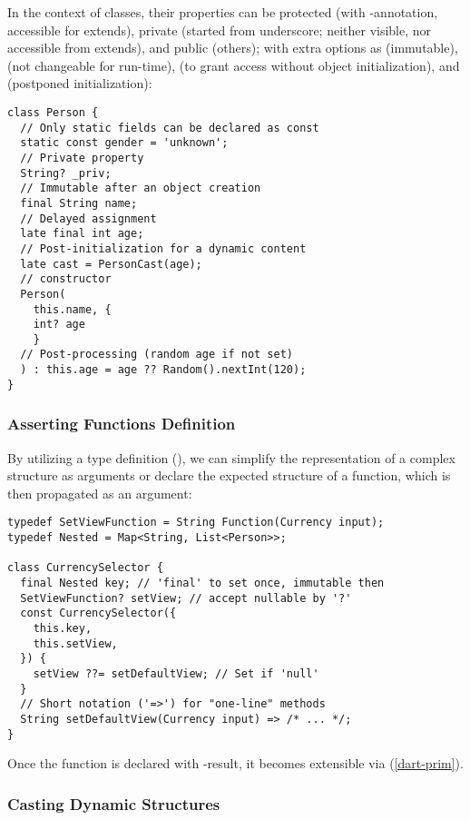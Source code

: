 \noindent In the context of classes, their properties can be protected (with -annotation, accessible for 
extends), private (started from underscore; neither visible, nor accessible from extends), and public (others); 
with extra options as  (immutable),  (not changeable for run-time),  (to 
grant access without object initialization), and  (postponed initialization):

\begin{lstlisting}
class Person {
  // Only static fields can be declared as const
  static const gender = 'unknown';
  // Private property
  String? _priv;
  // Immutable after an object creation
  final String name;
  // Delayed assignment
  late final int age;
  // Post-initialization for a dynamic content
  late cast = PersonCast(age);
  // constructor
  Person(
    this.name, {
    int? age
    }
  // Post-processing (random age if not set)
  ) : this.age = age ?? Random().nextInt(120);
}
\end{lstlisting}


\subsubsection{Asserting Functions Definition}

By utilizing a type definition (), we can simplify the representation of a complex structure as arguments or 
declare the expected structure of a function, which is then propagated as an argument:

\begin{lstlisting}
typedef SetViewFunction = String Function(Currency input);
typedef Nested = Map<String, List<Person>>;

class CurrencySelector {
  final Nested key; // 'final' to set once, immutable then
  SetViewFunction? setView; // accept nullable by '?'
  const CurrencySelector({
    this.key,
    this.setView,
  }) {
    setView ??= setDefaultView; // Set if 'null'
  }
  // Short notation ('=>') for "one-line" methods
  String setDefaultView(Currency input) => /* ... */;
}
\end{lstlisting}

\noindent Once the function is declared with -result, it becomes extensible via  (\ref{dart-prim}).


\subsubsection{Casting Dynamic Structures}

